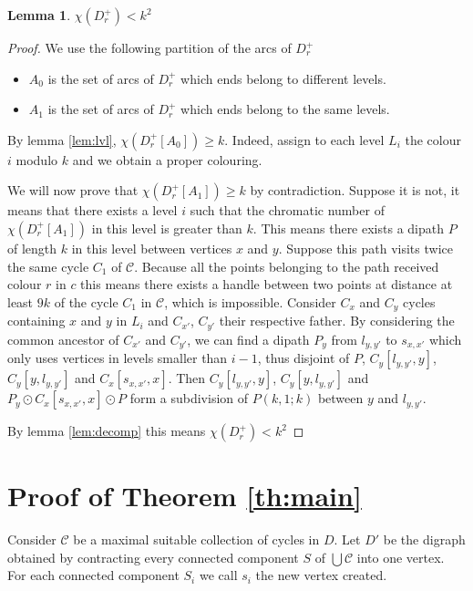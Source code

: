 \documentclass[utf8,10pt]{article}
\theoremstyle{plain}
\newtheorem{lemma}[theorem]{Lemma}
\theoremstyle{definition}
\theoremstyle{remark}
\newcommand{\dr}{ k^2}
\begin{document}
\begin{lemma}
$\chi(D_r^+) < \dr$
\end{lemma}

\begin{proof}
We use the following partition of the arcs of $D_r^+$

\begin{itemize}
	\item $A_0$ is the set of arcs of $D_r^+$ which ends belong to different levels.
	\item $A_1$ is the set of arcs of $D_r^+$ which ends belong to the same levels.
\end{itemize} 

By lemma \ref{lem:lvl}, $\chi(D_r^+[A_0]) \geq k$. Indeed, assign to each level $L_i$ the colour $i$ modulo $k$ and
we obtain a proper colouring.

We will now prove that $\chi(D_r^+[A_1]) \geq k$ by contradiction. 
Suppose it is not, it means that there exists a level $i$ such that the chromatic number of $\chi(D_r^+[A_1])$ in this level is greater 
than $k$. This means there exists a dipath $P$ of length $k$ in this level between vertices $x$ and $y$. Suppose this path visits twice 
the same cycle $C_1$ of $\mathcal{C}$. Because all the points belonging to the path received colour $r$ in $c$ this means there exists a 
handle between two points at distance at least $9k$ of the cycle $C_1$ in $\mathcal{C}$, which is impossible. 
Consider $C_x$ and $C_y$ cycles containing $x$ and $y$ in $L_i$ and $C_{x'}$, $C_{y'}$ their respective father. 
By considering the common ancestor of $C_{x'}$ and $C_{y'}$, we can find a dipath $P_y$ from $l_{y,y'}$ to $s_{x,x'}$ which 
only uses vertices in levels smaller than $i-1$, thus disjoint of $P$, $C_y[l_{y,y'}, y]$, $C_y[y, l_{y,y'}]$ and $C_x[s_{x,x'}, x]$. 
Then $C_y[l_{y,y'}, y]$, $C_y[y, l_{y,y'}]$ and $P_y \odot C_x[s_{x,x'}, x] \odot P$ form a subdivision of $P(k,1;k)$ between $y$ 
and $l_{y,y'}$. 

By lemma \ref{lem:decomp} this means $\chi(D_r^+) <  \dr$ 

\end{proof}

\section{Proof of Theorem \ref{th:main}}

Consider $\mathcal{C}$ be a maximal suitable collection of cycles in $D$. Let $D'$ be the digraph obtained by contracting 
every connected component $S$ of $\bigcup \mathcal{C}$ into one vertex. For each connected component $S_i$ we call $s_i$ the
new vertex created.
\end{document}
